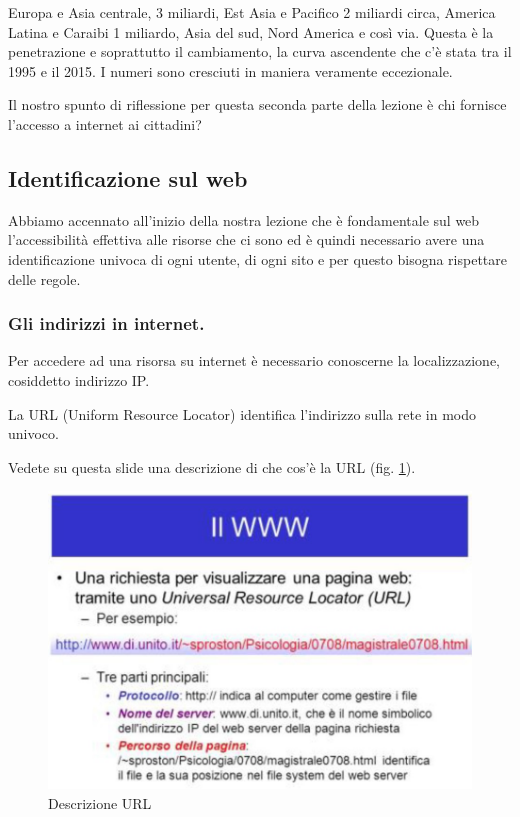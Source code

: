 Europa e Asia centrale, 3 miliardi, Est Asia e Pacifico 2 miliardi circa, America Latina e Caraibi 1 miliardo, Asia del sud, Nord America e così via. Questa è la penetrazione e soprattutto il cambiamento, la curva ascendente che c'è stata tra il 1995 e il 2015. I numeri sono cresciuti in maniera veramente eccezionale. 

Il nostro spunto di riflessione per questa seconda parte della lezione è chi fornisce l'accesso a internet ai cittadini?

\subsection{Identificazione sul web}

Abbiamo accennato all'inizio della nostra lezione che è fondamentale sul web l'accessibilità effettiva alle risorse che ci sono ed è quindi necessario avere una identificazione univoca di ogni utente, di ogni sito e  per questo bisogna rispettare delle regole.

\subsubsection{Gli indirizzi in internet.}

Per accedere ad una risorsa su internet è necessario conoscerne la localizzazione, cosiddetto indirizzo IP.

La URL (Uniform Resource Locator) identifica l'indirizzo sulla rete in modo univoco.

Vedete su questa slide una descrizione di che cos'è la URL (fig. \ref{fig:descrizione_URL}).

\begin{figure}[ht]
    \centering
    \includegraphics[width=0.9\linewidth]{images/03_lez_fig_07.jpg}
    \caption{Descrizione URL}
    \label{fig:descrizione_URL}
\end{figure}

